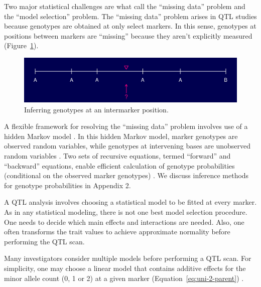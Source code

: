 \documentclass[oneside]{book}\usepackage[]{graphicx}\usepackage[]{color}
\begin{document}
Two major statistical challenges are what \citet{broman2009guide} call 
the ``missing data'' problem and the ``model selection'' problem. 
The ``missing data'' problem arises in QTL studies because genotypes are obtained
at only select markers. In this sense, genotypes at positions between
markers are ``missing'' because they aren't explicitly measured (Figure~\ref{fig:genoprob1}). 

\begin{figure}
\includegraphics[width = \textwidth]{figs/genoprob1.pdf}
\caption{Inferring genotypes at an intermarker position.}\label{fig:genoprob1}
\end{figure}







A flexible framework for resolving the ``missing data'' problem involves use of a
hidden Markov model \citep{broman2009guide, broman2006use}. 
In this hidden Markov model, marker genotypes are observed random variables, 
while genotypes at intervening bases are unobserved random variables \citep{broman2009guide,broman2006use}. 
Two sets of recursive equations, termed ``forward'' and ``backward'' equations,
enable efficient calculation of genotype probabilities
(conditional on the observed marker genotypes) \citep{baum1970maximization}. We discuss inference methods for genotype probabilities in Appendix 2.




A QTL analysis involves choosing a statistical model to be fitted at every marker. 
As in any statistical modeling, there is not one best model selection procedure.
One needs to decide which main effects and interactions are needed.
Also, one often transforms the trait values to achieve approximate normality before performing the QTL scan. 

Many investigators consider multiple models before performing a QTL scan.
For simplicity, one may choose a linear model that contains additive effects for
the  minor allele count (0, 1 or 2) at a given marker (Equation~\ref{eq:uni-2-parent}) \citep{martinez1992estimating,haley1992simple}.
\end{document}
